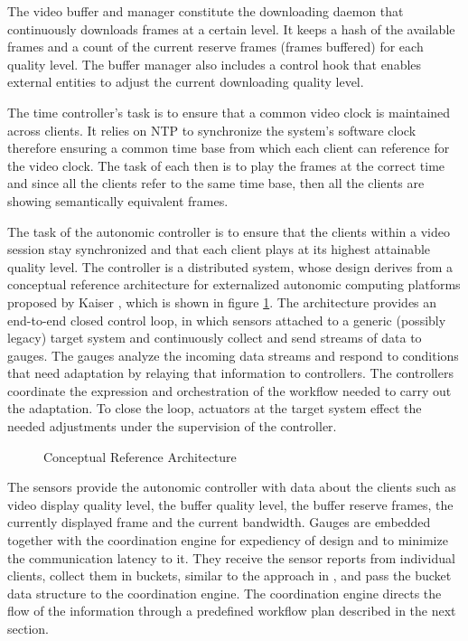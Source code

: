 \documentclass{sig-alternate}
\begin{document}
The video buffer and manager constitute the downloading daemon that
continuously downloads frames at a certain level.  It keeps a hash of
the available frames and a count of the current reserve frames (frames
buffered) for each quality level.  The buffer manager also includes a
control hook that enables external entities to adjust the current
downloading quality level.

The time controller's task is to ensure that a common video clock is
maintained across clients.  It relies on NTP \cite{NTP} to synchronize
the system's software clock therefore ensuring a common time base from
which each client can reference for the video clock.  The task of each
then is to play the frames at the correct time and since all the
clients refer to the same time base, then all the clients are showing
semantically equivalent frames.

The task of the autonomic controller is to ensure that the clients
within a video session stay synchronized and that each client plays at
its highest attainable quality level.  The controller is a distributed
system, whose design derives from a conceptual reference architecture
for externalized autonomic computing platforms proposed by Kaiser
\cite{REFARCH}, which is shown in figure \ref{refarch}. The
architecture provides an end-to-end closed control loop, in which
sensors attached to a generic (possibly legacy) target system and
continuously collect and send streams of data to gauges.  The gauges
analyze the incoming data streams and respond to conditions that need
adaptation by relaying that information to controllers.  The
controllers coordinate the expression and orchestration of the
workflow needed to carry out the adaptation.  To close the loop,
actuators at the target system effect the needed adjustments under the
supervision of the controller.

%
%

\begin{figure}
 \centering
  \label{refarch}
 \caption{Conceptual Reference Architecture}
\end{figure}


The sensors provide the autonomic controller with data about the
clients such as video display quality level, the buffer quality level,
the buffer reserve frames, the currently displayed frame and the
current bandwidth.  Gauges are embedded together with the coordination
engine for expediency of design and to minimize the communication
latency to it.  They receive the sensor reports from individual
clients, collect them in buckets, similar to the approach in
\cite{MIMAZE}, and pass the bucket data structure to the coordination
engine.  The coordination engine directs the flow of the information
through a predefined workflow plan described in the next section.
\end{document}
